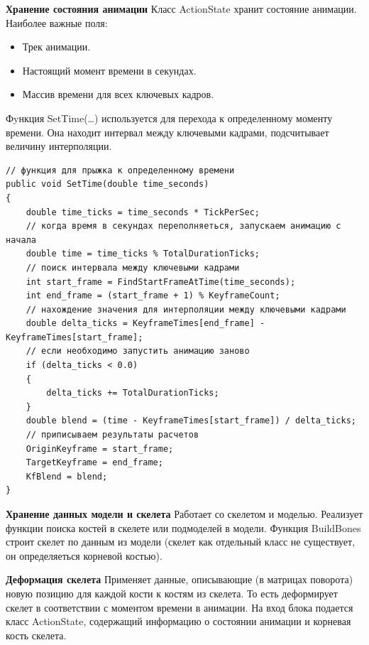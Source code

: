 \textbf{Хранение состояния анимации}
Класс ActionState хранит состояние анимации. Наиболее важные поля:
\begin{itemize}
\item Трек анимации.
\item Настоящий момент времени в секундах.
\item Массив времени для всех ключевых кадров.
\end{itemize}

Фyнкция SetTime(\dots) используется для перехода к определенному моменту времени. Она находит интервал между ключевыми кадрами, подсчитывает величину интерполяции.

\begin{verbatim}
// функция для прыжка к определенному времени
public void SetTime(double time_seconds)
{            
    double time_ticks = time_seconds * TickPerSec;
    // когда время в секундах переполняеться, запускаем анимацию с начала
    double time = time_ticks % TotalDurationTicks;
    // поиск интервала между ключевыми кадрами
    int start_frame = FindStartFrameAtTime(time_seconds);
    int end_frame = (start_frame + 1) % KeyframeCount;
    // нахождение значения для интерполяции между ключевыми кадрами
    double delta_ticks = KeyframeTimes[end_frame] - KeyframeTimes[start_frame];
    // если необходимо запустить анимацию заново
    if (delta_ticks < 0.0)
    {
        delta_ticks += TotalDurationTicks;
    }
    double blend = (time - KeyframeTimes[start_frame]) / delta_ticks;
    // приписываем результаты расчетов
    OriginKeyframe = start_frame;
    TargetKeyframe = end_frame;
    KfBlend = blend;
}
\end{verbatim}


\textbf{Хранение данных модели и скелета}
Работает со скелетом и моделью.
Реализует функции поиска костей в скелете или подмоделей в модели.
Функция BuildBones строит скелет по данным из модели (скелет как отдельный класс не существует, он определяеться корневой костью).


\textbf{Деформация скелета}
Применяет данные, описывающие (в матрицах поворота) новую позицию для каждой кости к костям из скелета.
То есть деформирует скелет в соответствии с моментом времени в анимации. На вход блока подается класс ActionState, содержащий информацию о состоянии анимации и корневая кость скелета.

